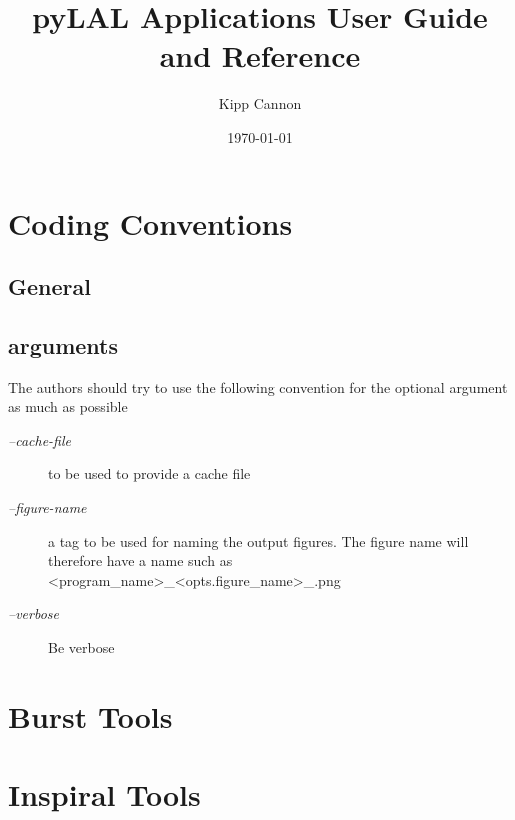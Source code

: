\documentclass{book}
\title{pyLAL Applications User Guide and Reference}
\author{Kipp Cannon}
\date{\today}
\begin{document}
\maketitle
\tableofcontents
\listoftables
\listoffigures
\chapter{Coding Conventions}
\section{General}

\section{arguments}
The authors should try to use the following convention for the optional
argument as much as possible
\begin{description}
\item[\textit{--cache-file}] to be used to provide a cache file
\item[\textit{--figure-name}] a tag to be used for naming the output figures.
The figure name will therefore have a name such as
<program\_name>\_<opts.figure\_name>\_<whatever is in your program>.png
\item[\textit{--verbose}] Be verbose


\end{description}

\chapter{Burst Tools}

\chapter{Inspiral Tools}

\end{document}
